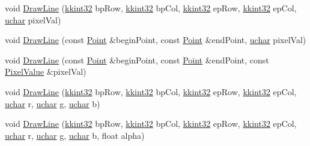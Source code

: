 \begin{DoxyCompactItemize}
\item 
void \hyperlink{class_k_k_b_1_1_raster_a2d611fbbce8226f7f0fd7f3e1bab9f78}{Draw\+Line} (\hyperlink{namespace_k_k_b_a8fa4952cc84fda1de4bec1fbdd8d5b1b}{kkint32} bp\+Row, \hyperlink{namespace_k_k_b_a8fa4952cc84fda1de4bec1fbdd8d5b1b}{kkint32} bp\+Col, \hyperlink{namespace_k_k_b_a8fa4952cc84fda1de4bec1fbdd8d5b1b}{kkint32} ep\+Row, \hyperlink{namespace_k_k_b_a8fa4952cc84fda1de4bec1fbdd8d5b1b}{kkint32} ep\+Col, \hyperlink{namespace_k_k_b_ace9969169bf514f9ee6185186949cdf7}{uchar} pixel\+Val)
\item 
void \hyperlink{class_k_k_b_1_1_raster_ac6461ac804cc01723c4359e156fa9fab}{Draw\+Line} (const \hyperlink{class_k_k_b_1_1_point}{Point} \&begin\+Point, const \hyperlink{class_k_k_b_1_1_point}{Point} \&end\+Point, \hyperlink{namespace_k_k_b_ace9969169bf514f9ee6185186949cdf7}{uchar} pixel\+Val)
\item 
void \hyperlink{class_k_k_b_1_1_raster_a45e0f83a666f40d6d84e674f996b7570}{Draw\+Line} (const \hyperlink{class_k_k_b_1_1_point}{Point} \&begin\+Point, const \hyperlink{class_k_k_b_1_1_point}{Point} \&end\+Point, const \hyperlink{class_k_k_b_1_1_pixel_value}{Pixel\+Value} \&pixel\+Val)
\item 
void \hyperlink{class_k_k_b_1_1_raster_a6c5dcf4f51729014eb17ee0acf33b94c}{Draw\+Line} (\hyperlink{namespace_k_k_b_a8fa4952cc84fda1de4bec1fbdd8d5b1b}{kkint32} bp\+Row, \hyperlink{namespace_k_k_b_a8fa4952cc84fda1de4bec1fbdd8d5b1b}{kkint32} bp\+Col, \hyperlink{namespace_k_k_b_a8fa4952cc84fda1de4bec1fbdd8d5b1b}{kkint32} ep\+Row, \hyperlink{namespace_k_k_b_a8fa4952cc84fda1de4bec1fbdd8d5b1b}{kkint32} ep\+Col, \hyperlink{namespace_k_k_b_ace9969169bf514f9ee6185186949cdf7}{uchar} r, \hyperlink{namespace_k_k_b_ace9969169bf514f9ee6185186949cdf7}{uchar} g, \hyperlink{namespace_k_k_b_ace9969169bf514f9ee6185186949cdf7}{uchar} b)
\item 
void \hyperlink{class_k_k_b_1_1_raster_a5f85d89a5a5c23a5f19cd2090d39cfc5}{Draw\+Line} (\hyperlink{namespace_k_k_b_a8fa4952cc84fda1de4bec1fbdd8d5b1b}{kkint32} bp\+Row, \hyperlink{namespace_k_k_b_a8fa4952cc84fda1de4bec1fbdd8d5b1b}{kkint32} bp\+Col, \hyperlink{namespace_k_k_b_a8fa4952cc84fda1de4bec1fbdd8d5b1b}{kkint32} ep\+Row, \hyperlink{namespace_k_k_b_a8fa4952cc84fda1de4bec1fbdd8d5b1b}{kkint32} ep\+Col, \hyperlink{namespace_k_k_b_ace9969169bf514f9ee6185186949cdf7}{uchar} r, \hyperlink{namespace_k_k_b_ace9969169bf514f9ee6185186949cdf7}{uchar} g, \hyperlink{namespace_k_k_b_ace9969169bf514f9ee6185186949cdf7}{uchar} b, float alpha)
\item 

\end{DoxyCompactItemize}
